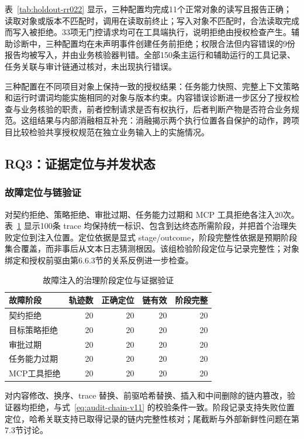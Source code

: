 表~\ref{tab:holdout-rr022} 显示，三种配置均完成11个正常对象的读写且报告正确；读取对象或版本不匹配时，调用在读取前终止；写入对象不匹配时，合法读取完成而写入被拒绝。33项无门控请求均可在工具端执行，说明拒绝由授权检查产生。辅助诊断中，三种配置均在未声明事件创建任务前拒绝；权限合法但内容错误的9份报告均被写入，并由业务核验器判错。全部150条主运行和辅助运行的工具记录、任务关联与审计链通过核对，未出现执行错误。

三种配置在不同项目对象上保持一致的授权结果：任务能力快照、完整上下文策略和运行时谓词均能实施相同的对象与版本约束。内容错误诊断进一步区分了授权检查与业务核验的职责，前者控制请求是否有权执行，后者判断产物是否符合业务规范。这组结果与内部消融相互补充：消融揭示两个执行位置各自保护的动作，跨项目比较检验共享授权规范在独立业务输入上的实施情况。

\subsection{RQ3：证据定位与并发状态}

\subsubsection{故障定位与链验证}

对契约拒绝、策略拒绝、审批过期、任务能力过期和 MCP 工具拒绝各注入20次。表~\ref{tab:rq3-trace-v11} 显示100条 trace 均保持统一标识、包含到达终态所需阶段，并把首个治理失败定位到注入位置。定位依据是显式 stage/outcome，阶段完整性依据是预期阶段集合覆盖，而非事后从文本日志猜测根因。该组检验阶段定位与记录完整性；对象绑定和授权前驱由第6.6.3节的关系反例进一步检查。

\begin{table}[htbp]
\centering
\caption{故障注入的治理阶段定位与证据验证}
\label{tab:rq3-trace-v11}
\small
\begin{tabular}{lrrrr}
\toprule
故障阶段 & 轨迹数 & 正确定位 & 链有效 & 阶段完整 \\
\midrule
契约拒绝 & 20 & 20 & 20 & 20 \\
目标策略拒绝 & 20 & 20 & 20 & 20 \\
审批过期 & 20 & 20 & 20 & 20 \\
任务能力过期 & 20 & 20 & 20 & 20 \\
MCP工具拒绝 & 20 & 20 & 20 & 20 \\
\bottomrule
\end{tabular}
\end{table}

对内容修改、换序、trace 替换、前驱哈希替换、插入和中间删除的链内篡改，验证器均拒绝，与式~\eqref{eq:audit-chain-v11} 的校验条件一致。阶段记录支持失败位置定位，哈希关联支持已取得记录的链内完整性核对；尾截断与外部新鲜性问题在第7.3节讨论。

